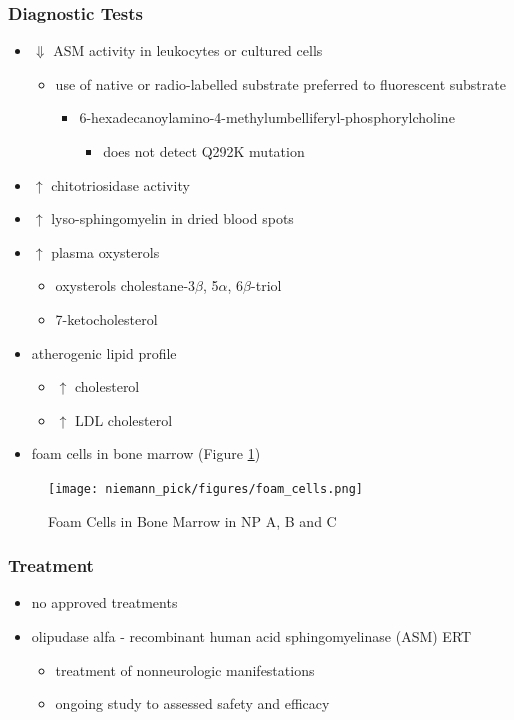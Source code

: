 \documentclass[12pt]{scrartcl}
\begin{document}
\subsubsection{Diagnostic Tests}
\label{sec:orge6a00a4}
\begin{itemize}
\item \(\Downarrow\) ASM activity in leukocytes or cultured cells
\begin{itemize}
\item use of native or radio-labelled substrate preferred to fluorescent substrate
\begin{itemize}
\item 6-hexadecanoylamino-4-methylumbelliferyl-phosphorylcholine
\begin{itemize}
\item does not detect Q292K mutation
\end{itemize}
\end{itemize}
\end{itemize}
\item \(\uparrow\) chitotriosidase activity
\item \(\uparrow\) lyso-sphingomyelin in dried blood spots
\item \(\uparrow\) plasma oxysterols
\begin{itemize}
\item oxysterols cholestane-3\(\beta\), 5\(\alpha\), 6\(\beta\)-triol
\item 7-ketocholesterol
\end{itemize}
\item atherogenic lipid profile 
\begin{itemize}
\item \(\uparrow\) cholesterol
\item \(\uparrow\) LDL cholesterol
\end{itemize}
\item foam cells in bone marrow (Figure \ref{fig:org517a9d0})
\end{itemize}

\begin{figure}[htbp]
\centering
\texttt{[image: niemann\_pick/figures/foam\_cells.png]}
\caption{\label{fig:org517a9d0}Foam Cells in Bone Marrow in NP A, B and C}
\end{figure}

\subsubsection{Treatment}
\label{sec:org9c65371}
\begin{itemize}
\item no approved treatments
\item olipudase alfa - recombinant human acid sphingomyelinase (ASM) ERT
\begin{itemize}
\item treatment of nonneurologic manifestations
\item ongoing study to assessed safety and efficacy
\end{itemize}
\end{itemize}
\end{document}
